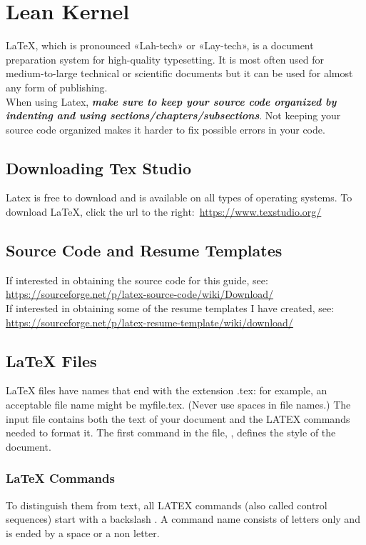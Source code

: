 \section{Lean Kernel}
\vspace{10.5cm}
	LaTeX, which is pronounced «Lah-tech» or «Lay-tech», is a document preparation system for high-quality typesetting. It is most often used for medium-to-large technical or scientific documents but it can be used for almost any form of publishing.\\
	When using Latex, \textbf{\emph{make sure to keep your source code organized by indenting and using sections/chapters/subsections}}. Not keeping your source code organized makes it harder to fix possible errors in your code.
	\subsection{Downloading Tex Studio}
			Latex is free to download and is available on all types of operating systems. To download \LaTeX, click the url to the right:\, \url{https://www.texstudio.org/}
	\subsection{Source Code and Resume Templates}
			If interested in obtaining the source code for this guide, see:\\
			\url{https://sourceforge.net/p/latex-source-code/wiki/Download/}\\
			If interested in obtaining some of the resume templates I have created, see:\\ \url{https://sourceforge.net/p/latex-resume-template/wiki/download/}
	\subsection{LaTeX Files}
			LaTeX files have names that end with the extension .tex: for example, an acceptable file name might be myfile.tex. (Never use spaces in file names.) The input file contains both the text of your document and the LATEX commands needed to format it. The first command in the file, , defines the style of the document.
	\subsubsection{LaTeX Commands}
			To distinguish them from text, all LATEX commands (also called control sequences) start with a backslash \cs. A command name consists of letters only and is ended by a space or a non letter.
